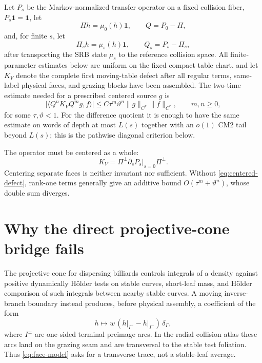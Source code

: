 \documentclass[11pt]{article}
\newcommand{\one}{\mathbf 1}
\begin{document}
Let $P_s$ be the Markov-normalized transfer operator on a fixed collision
fiber, $P_s\one=\one$, let
\[
  \Pi h=\mu_0(h)\one,\qquad Q=P_0-\Pi,
\]
and, for finite $s$, let
\[
  \Pi_s h=\mu_s(h)\one,\qquad Q_s=P_s-\Pi_s,
\]
after transporting the SRB state $\mu_s$ to the reference collision space.
All finite-parameter estimates below are uniform on the fixed compact table
chart.
and let $K_V$ denote the complete first moving-table defect after all regular
terms, same-label physical faces, and grazing blocks have been assembled.  The
two-time estimate needed for a prescribed centered source $g$ is
\begin{equation}
\label{eq:CM2}
 \bigl|\langle Q^nK_VQ^mg,f\rangle\bigr|
 \le C\tau^m\vartheta^n\|g\|_{C^r}\|f\|_{C^r},
 \qquad m,n\ge0,
\end{equation}
for some $\tau,\vartheta<1$.  For the difference quotient it is enough to
have the same estimate on words of depth at most $L(s)$ together with an
$o(1)$ CM2 tail beyond $L(s)$; this is the pathwise diagonal criterion below.

The operator must be centered as a whole:
\begin{equation}
\label{eq:centered-defect}
  K_V=\Pi^\perp\left.\partial_sP_s\right|_{s=0}\Pi^\perp.
\end{equation}
Centering separate faces is neither invariant nor sufficient.  Without
\eqref{eq:centered-defect}, rank-one terms generally give an additive bound
$O(\tau^m+\vartheta^n)$, whose double sum diverges.

\section{Why the direct projective-cone bridge fails}

The projective cone for dispersing billiards controls integrals of a density
against positive dynamically H\"older tests on stable curves, short-leaf
mass, and H\"older comparison of such integrals between nearby stable curves.
A moving inverse-branch boundary instead produces, before physical assembly,
a coefficient of the form
\begin{equation}
\label{eq:face-model}
  h\longmapsto w\,(h\vert_{I^+}-h\vert_{I^-})\,\delta_\Gamma,
\end{equation}
where $I^\pm$ are one-sided terminal preimage arcs.  In the radial collision
atlas these arcs land on the grazing seam and are transversal to the stable
test foliation.  Thus \eqref{eq:face-model} asks for a transverse trace, not a
stable-leaf average.
\end{document}
